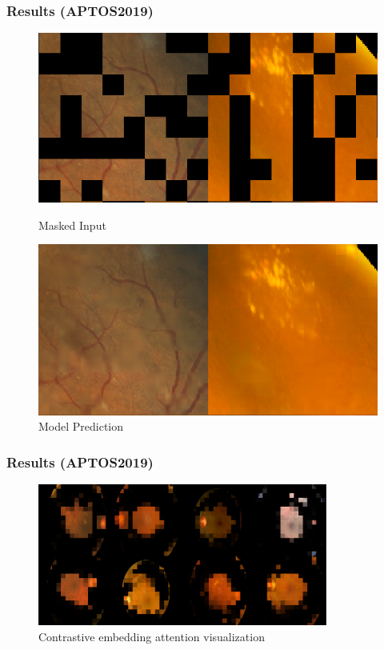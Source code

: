 \documentclass{beamer}
\begin{document}
\begin{frame}
   \frametitle{Results (APTOS2019)}
   \begin{figure}
       \centering
       \begin{minipage}{0.45\textwidth}
           \centering
           \includegraphics[width=\textwidth]{mae_img.png}
           \caption{Masked Input}
       \end{minipage}\hfill
       \begin{minipage}{0.45\textwidth}
           \centering
           \includegraphics[width=\textwidth]{mae_pred.png}
           \caption{Model Prediction}
       \end{minipage}
   \end{figure}
\end{frame}

\begin{frame}
   \frametitle{Results (APTOS2019)}
   \begin{figure}
       \centering
       \includegraphics[width=0.85\textwidth]{attn_vis.png}
       \caption{Contrastive embedding attention visualization}
   \end{figure}
\end{frame}
\end{document}
